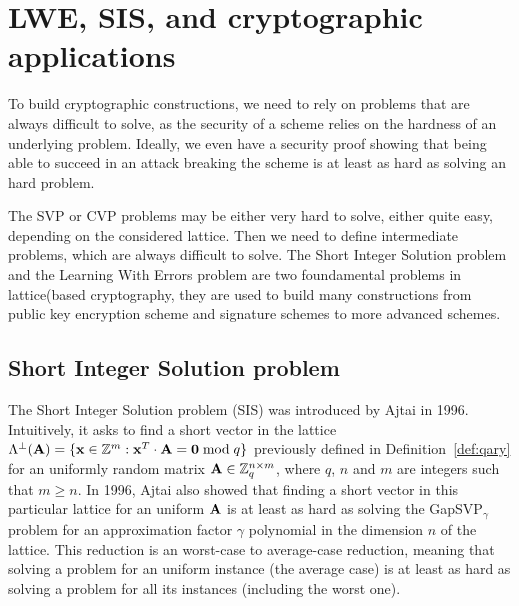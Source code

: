\section{LWE, SIS, and cryptographic applications}
\label{se:LBC}



To build cryptographic constructions, we need to rely on problems that are always difficult to solve, as the security of a scheme relies on the hardness of an underlying problem. Ideally, we even have a security proof showing that being able to succeed in an attack breaking the scheme is at least as hard as solving an hard problem.

The SVP or CVP problems may be either very hard to solve, either quite easy, depending on the considered lattice. Then we need to define intermediate problems, which are always difficult to solve.
The Short Integer Solution problem and the Learning With Errors problem are two foundamental problems in lattice(based cryptography, they are used to build many constructions from public key encryption scheme and signature schemes to more advanced schemes.


\subsection{Short Integer Solution problem}

The Short Integer Solution problem (SIS) was introduced by Ajtai in 1996. Intuitively, it asks to find a short vector in the lattice $\Lambda^\perp({\bf A}) = \{ {\bf x} \in \mathbb{Z}^m: {\bf x}^T \cdot {\bf A} = {\bf 0} \bmod q\}$ previously defined in Definition~\ref{def:qary} for an uniformly random matrix ${\bf A} \in \mathbb{Z}_q^{n \times m}$, where $q$, $n$ and $m$ are integers such that $m \geq n$.
In 1996, Ajtai also showed that finding a short vector in this particular lattice for an uniform $\bf A$ is at least as hard as solving the GapSVP$_{\gamma}$ problem for an approximation factor $\gamma$ polynomial in the dimension $n$ of the lattice.
This reduction is an worst-case to average-case reduction, meaning that solving a problem for an uniform instance (the average case) is at least as hard as solving a problem for all its instances (including the worst one).


